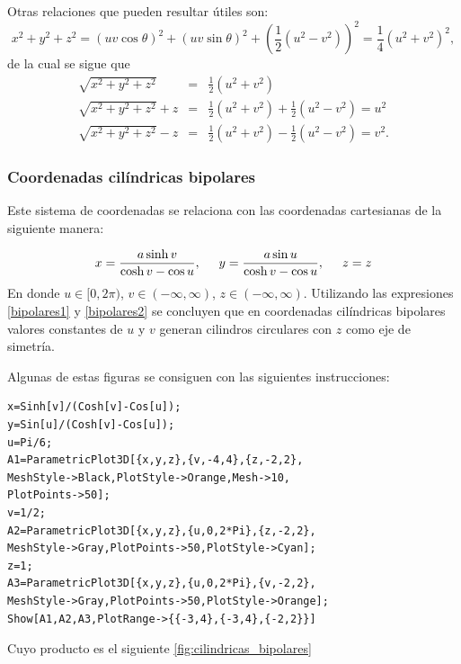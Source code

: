 Otras relaciones que pueden resultar útiles son:
\[x^2+y^2+z^2=\left( uv\cos \theta \right) ^2+\left( uv\sin \theta
\right) ^2+\left( \frac{1}{2}\left( u^2-v^2\right) \right) ^2= \frac{1}{4}\left( u^2+v^2\right) ^2,\]
de la cual se sigue que
\begin{eqnarray*}
\sqrt{x^2+y^2+z^2}&=&\frac{1}{2}\left( u^2+v^2\right) \\
\sqrt{x^2+y^2+z^2}+z &=& \frac{1}{2}\left( u^2+v^2\right) +\frac{1}{2}\left( u^2-v^2\right) = u^2\\
\sqrt{x^2+y^2+z^2}-z &=& \frac{1}{2}\left( u^2+v^2\right) -\frac{1}{2}\left( u^2-v^2\right) = v^2.
\end{eqnarray*}

\subsubsection{Coordenadas cilíndricas bipolares} 
Este sistema de coordenadas se relaciona con las coordenadas cartesianas de la siguiente manera:

\begin{equation}
x = \frac{a\sinh v}{\cosh v-\cos u},\hskip0.5cm y =\frac{a\sin u}{\cosh v-\cos u}, \hskip0.5cm z = z
\end{equation}
En donde $u\in \lbrack 0,2\pi )$, $v\in (-\infty ,\infty )$, $z\in (-\infty,\infty )$.
Utilizando las expresiones \ref{bipolares1} y \ref{bipolares2} se concluyen que en
coordenadas cilíndricas bipolares valores constantes de $u$ y $v$ generan cilindros circulares con $z$ como eje de simetría.

Algunas de estas figuras se consiguen con las siguientes instrucciones:

\begin{tcolorbox}[title=\bf Instrucción \verb"Mathematica"]\begin{Verbatim}[formatcom=\letraverbatim]
x=Sinh[v]/(Cosh[v]-Cos[u]);
y=Sin[u]/(Cosh[v]-Cos[u]);
u=Pi/6;
A1=ParametricPlot3D[{x,y,z},{v,-4,4},{z,-2,2},
MeshStyle->Black,PlotStyle->Orange,Mesh->10,
PlotPoints->50];
v=1/2;
A2=ParametricPlot3D[{x,y,z},{u,0,2*Pi},{z,-2,2},
MeshStyle->Gray,PlotPoints->50,PlotStyle->Cyan];
z=1;
A3=ParametricPlot3D[{x,y,z},{u,0,2*Pi},{v,-2,2},
MeshStyle->Gray,PlotPoints->50,PlotStyle->Orange];
Show[A1,A2,A3,PlotRange->{{-3,4},{-3,4},{-2,2}}]
\end{Verbatim}
\end{tcolorbox}

Cuyo producto es el siguiente \ref{fig:cilindricas_bipolares}

